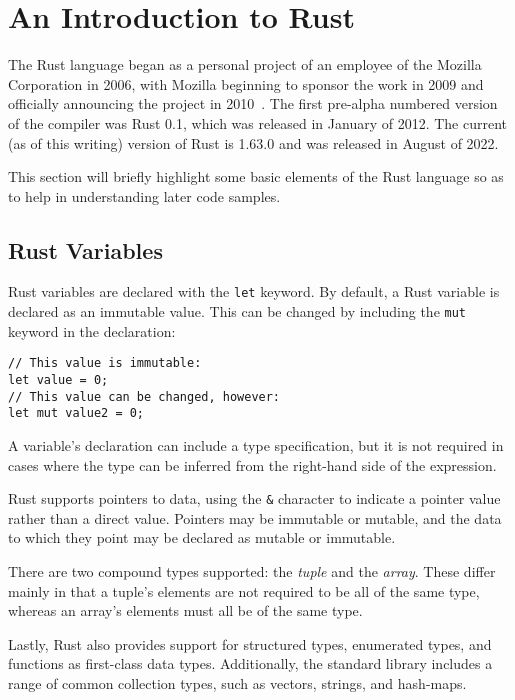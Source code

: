 \section{An Introduction to Rust}
\label{sec:rust}

The Rust language began as a personal project of an employee of the Mozilla Corporation in 2006, with Mozilla beginning to sponsor the work in 2009 and officially announcing the project in 2010~\cite{asay.2021}. The first pre-alpha numbered version of the compiler was Rust 0.1, which was released in January of 2012. The current (as of this writing) version of Rust is 1.63.0 and was released in August of 2022.

This section will briefly highlight some basic elements of the Rust language so as to help in understanding later code samples.

\subsection{Rust Variables}

Rust variables are declared with the \texttt{let} keyword. By default, a Rust variable is declared as an immutable value. This can be changed by including the \texttt{mut} keyword in the declaration:

\begin{lstlisting}
// This value is immutable:
let value = 0;
// This value can be changed, however:
let mut value2 = 0;
\end{lstlisting}

A variable's declaration can include a type specification, but it is not required in cases where the type can be inferred from the right-hand side of the expression.

Rust supports pointers to data, using the \texttt{\&} character to indicate a pointer value rather than a direct value. Pointers may be immutable or mutable, and the data to which they point may be declared as mutable or immutable.

There are two compound types supported: the \textit{tuple} and the \textit{array}. These differ mainly in that a tuple's elements are not required to be all of the same type, whereas an array's elements must all be of the same type.

Lastly, Rust also provides support for structured types, enumerated types, and functions as first-class data types. Additionally, the standard library includes a range of common collection types, such as vectors, strings, and hash-maps.

